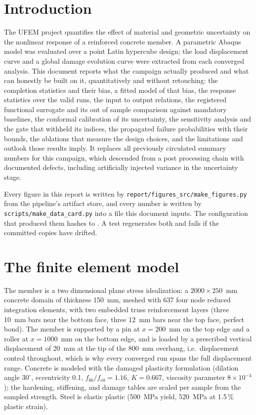 \documentclass[11pt,a4paper]{article}
\begin{document}
\section{Introduction}
The UFEM project quantifies the effect of material and geometric uncertainty on the nonlinear response of a reinforced concrete member. A parametric Abaqus model was evaluated over a \NDesign{} point Latin hypercube design; the load displacement curve and a global damage evolution curve were extracted from each converged analysis. This document reports what the campaign actually produced and what can honestly be built on it, quantitatively and without retouching: the completion statistics and their bias, a fitted model of that bias, the response statistics over the valid runs, the input to output relations, the registered functional surrogate and its out of sample comparison against mandatory baselines, the conformal calibration of its uncertainty, the sensitivity analysis and the gate that withheld its indices, the propagated failure probabilities with their bounds, the ablations that measure the design choices, and the limitations and outlook those results imply. It replaces all previously circulated summary numbers for this campaign, which descended from a post processing chain with documented defects, including artificially injected variance in the uncertainty stage.

Every figure in this report is written by \texttt{report/figures\_src/make\_figures.py} from the pipeline's artifact store, and every number is written by \texttt{scripts/make\_data\_card.py} into a file this document inputs. The configuration that produced them hashes to \texttt{\ConfigHash}. A test regenerates both and fails if the committed copies have drifted.

\section{The finite element model}
\label{sec:model}
The member is a two dimensional plane stress idealization: a $2000 \times 250$~mm concrete domain of thickness 150~mm, meshed with 637 four node reduced integration elements, with two embedded truss reinforcement layers (three 10~mm bars near the bottom face, three 12~mm bars near the top face, perfect bond). The member is supported by a pin at $x = 200$~mm on the top edge and a roller at $x = 1000$~mm on the bottom edge, and is loaded by a prescribed vertical displacement of 20~mm at the tip of the 800~mm overhang, i.e.\ displacement control throughout, which is why every converged run spans the full displacement range. Concrete is modeled with the damaged plasticity formulation \cite{abaqus2025} (dilation angle $30^\circ$, eccentricity 0.1, $f_{b0}/f_{c0} = 1.16$, $K = 0.667$, viscosity parameter $8 \times 10^{-4}$); the hardening, stiffening, and damage tables are scaled per sample from the sampled strength. Steel is elastic plastic (500~MPa yield, 520~MPa at 1.5\,\% plastic strain).
\end{document}
